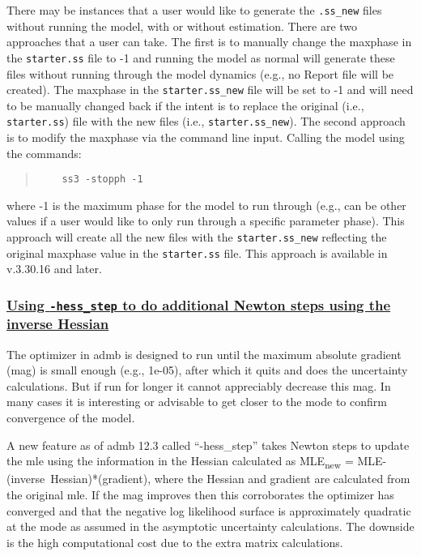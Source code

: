 There may be instances that a user would like to generate the \texttt{.ss\_new} files without running the model, with or without estimation. There are two approaches that a user can take. The first is to manually change the maxphase in the \texttt{starter.ss} file to -1 and running the model as normal will generate these files without running through the model dynamics (e.g., no Report file will be created). The maxphase in the \texttt{starter.ss\_new} file will be set to -1 and will need to be manually changed back if the intent is to replace the original (i.e., \texttt{starter.ss}) file with the new files (i.e., \texttt{starter.ss\_new}). The second approach is to modify the maxphase via the command line input. Calling the model using the commands:

\begin{quote}
	\begin{verbatim}
	ss3 -stopph -1
	\end{verbatim}
\end{quote}  

where -1 is the maximum phase for the model to run through (e.g., can be other values if a user would like to only run through a specific parameter phase). This approach will create all the new files with the \texttt{starter.ss\_new} reflecting the original maxphase value in the \texttt{starter.ss} file. This approach is available in v.3.30.16 and later.

\hypertarget{hess-step}{}
\subsubsection[Using \texttt{-hess\_step} to do additional Newton steps using the inverse Hessian]{\protect\hyperlink{hess-step}{Using \texttt{-hess\_step} to do additional Newton steps using the inverse Hessian}}

The optimizer in \gls{admb} is designed to run until the maximum absolute gradient (mag) is small enough (e.g., 1e-05), after which it quits and does the uncertainty calculations. But if run for longer it cannot appreciably decrease this mag. In many cases it is interesting or advisable to get closer to the mode to confirm convergence of the model. 

A new feature as of \gls{admb} 12.3 called ``-hess\_step'' takes Newton steps to update the \gls{mle} using the information in the Hessian calculated as MLE\textsubscript{new} = MLE-(inverse~Hessian)*(gradient), where the Hessian and gradient are calculated from the original \gls{mle}. If the mag improves then this corroborates the optimizer has converged and that the negative log likelihood surface is approximately quadratic at the mode as assumed in the asymptotic uncertainty calculations. The downside is the high computational cost due to the extra matrix calculations.

